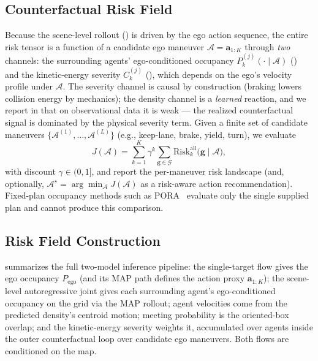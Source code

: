 \documentclass[journal]{IEEEtran}
\begin{document}
\subsection{Counterfactual Risk Field}\label{sec:counterfactual}
Because the scene-level rollout () is driven by the ego action sequence, the entire risk tensor is a function of a candidate ego maneuver $\mathcal{A}=\mathbf{a}_{1:K}$ through \emph{two} channels: the surrounding agents' ego-conditioned occupancy $P^{(j)}_k(\cdot\mid\mathcal{A})$ () and the kinetic-energy severity $C^{(j)}_k$ (), which depends on the ego's velocity profile under $\mathcal{A}$. The severity channel is causal by construction (braking lowers collision energy by mechanics); the density channel is a \emph{learned} reaction, and we report in  that on observational data it is weak --- the realized counterfactual signal is dominated by the physical severity term. Given a finite set of candidate maneuvers $\{\mathcal{A}^{(1)},\dots,\mathcal{A}^{(L)}\}$ (e.g., keep-lane, brake, yield, turn), we evaluate
\begin{equation}
J(\mathcal{A})=\sum_{k=1}^{K}\gamma^{k}\!\!\sum_{\mathbf{g}\in\mathcal{G}}\!\mathrm{Risk}^{\mathrm{all}}_{k}\big(\mathbf{g}\mid\mathcal{A}\big),
\label{eq:counterfactual_objective}
\end{equation}
with discount $\gamma\in(0,1]$, and report the per-maneuver risk landscape (and, optionally, $\mathcal{A}^\star=\arg\min_{\mathcal{A}} J(\mathcal{A})$ as a risk-aware action recommendation). Fixed-plan occupancy methods such as PORA~\cite{wang2025dynamic} evaluate only the single supplied plan and cannot produce this comparison.

\subsection{Risk Field Construction}\label{sec:risk_field_construction}
 summarizes the full two-model inference pipeline: the single-target flow gives the ego occupancy $P_{\mathrm{ego}}$ (and its MAP path defines the action proxy $\mathbf{a}_{1:K}$); the scene-level autoregressive joint gives each surrounding agent's ego-conditioned occupancy on the grid via the MAP rollout; agent velocities come from the predicted density's centroid motion; meeting probability is the oriented-box overlap; and the kinetic-energy severity weights it, accumulated over agents inside the outer counterfactual loop over candidate ego maneuvers. Both flows are conditioned on the map.
\end{document}
